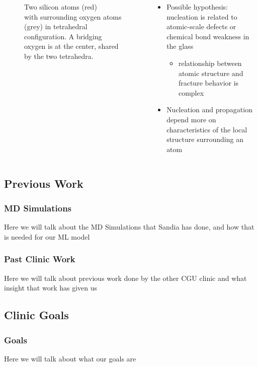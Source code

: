 {\begin{columns}
\begin{column}{.5\textwidth}
\begin{figure}[!b]
    \caption{Two silicon atoms (red)\\with surrounding oxygen atoms (grey) in tetrahedral configuration. A bridging oxygen is at the center, shared by the two tetrahedra.}
    \label{fig:tetrahedra}
\end{figure}
		\end{column}
   		\begin{column}{.6\textwidth}
        \begin{block}{}
		\begin{itemize} 
        \item Possible hypothesis: nucleation is related to atomic-scale defects or chemical bond weakness in the glass
		\begin{itemize} 
        \item relationship between atomic structure and fracture behavior is complex 
		\end{itemize}
        \item Nucleation and propagation depend more on characteristics of the local structure surrounding an atom\\
    \end{itemize}
    \end{block}
		\end{column}
	\end{columns}
}


\subsection{Previous Work}
\frame
{\frametitle{MD Simulations}
Here we will talk about the MD Simulations that Sandia has done, and how that is needed for our ML model
}

\frame
{\frametitle{Past Clinic Work}
Here we will talk about previous work done by the other CGU clinic and what insight that work has given us
}

\subsection{Clinic Goals}
\frame
{\frametitle{Goals}
Here we will talk about what our goals are
}